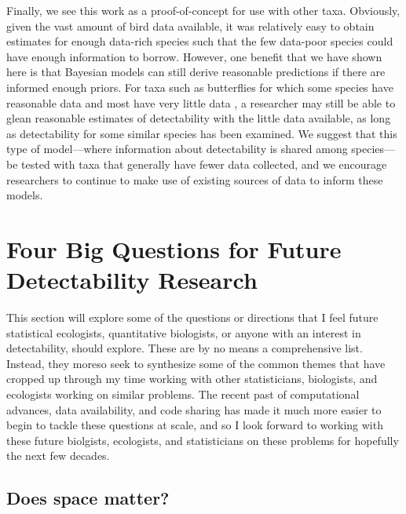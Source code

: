 \par Finally, we see this work as a proof-of-concept for use with other taxa.
Obviously, given the vast amount of bird data available, it was relatively easy to obtain estimates for enough data-rich species such that the few data-poor species could have enough information to borrow. 
However, one benefit that we have shown here is that Bayesian models can still derive reasonable predictions if there are informed enough priors.
For taxa such as butterflies for which some species have reasonable data and most have very little data \citep{lewthwaite_geographical_2022}, a researcher may still be able to glean reasonable estimates of detectability with the little data available, as long as detectability for some similar species has been examined.
We suggest that this type of model---where information about detectability is shared among species---be tested with taxa that generally have fewer data collected, and we encourage researchers to continue to make use of existing sources of data \citep{binley_minimizing_2023} to inform these models.

\section{Four Big Questions for Future Detectability Research}

\par This section will explore some of the questions or directions that I feel future statistical ecologists, quantitative biologists, or anyone with an interest in detectability, should explore.
These are by no means a comprehensive list.
Instead, they moreso seek to synthesize some of the common themes that have cropped up through my time working with other statisticians, biologists, and ecologists working on similar problems.
The recent past of computational advances, data availability, and code sharing has made it much more easier to begin to tackle these questions at scale, and so I look forward to working with these future biolgists, ecologists, and statisticians on these problems for hopefully the next few decades.

\subsection{Does space matter?}

